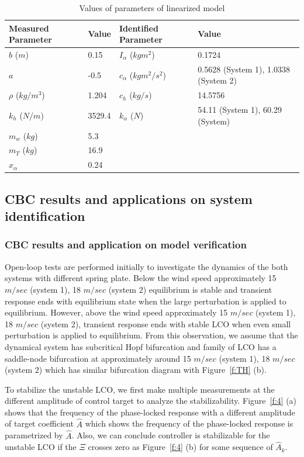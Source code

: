 \documentclass[openacc]{rsproca_new}%
\newcommand{\Fref}[1]{Figure~\ref{#1}}
\begin{document}
\begin{table}[!ht]
\caption{Values of parameters of linearized model}%
\label{t2}
\begin{tabular}{llll}%
\hline
Measured Parameter & Value & Identified Parameter & Value\\
\hline
$b$ ($m$) & 0.15   & $I_{\alpha}$ ($kgm^2$) & 0.1724   \\
$a$ & -0.5 & $c_\alpha$ ($kgm^2/s^2$) & 0.5628 (System 1), 1.0338 (System 2)   \\
$\rho$ ($kg/m^3$) & 1.204  & $c_h$ ($kg/s$)  & 14.5756   \\
$k_{h}$ ($N/m$) & 3529.4   & $k_\alpha$ ($N$) & 54.11 (System 1), 60.29 (System)   \\
$m_w$ ($kg$) & 5.3   & & \\
$m_T$ ($kg$) &  16.9   & &  \\
$x_\alpha$ & 0.24 & & \\
\hline
\end{tabular}
\vspace*{-4pt}
\end{table}%

\subsection{CBC results and applications on system identification}\label{results}
\subsubsection{CBC results and application on model verification}\label{lin_sys}
Open-loop tests are performed initially to investigate the dynamics of the both systems with different spring plate. Below the wind speed approximately 15 $m/sec$ (system 1), 18 $m/sec$ (system 2) equilibrium is stable and transient response ends with equilibrium state when the large perturbation is applied to equilibrium. However, above the wind speed approximately 15 $m/sec$ (system 1), 18 $m/sec$ (system 2), transient response ends with stable LCO when even small perturbation is applied to equilibrium. From this observation, we assume that the dynamical system has subcritical Hopf bifurcation and family of LCO has a saddle-node bifurcation at approximately around 15 $m/sec$ (system 1), 18 $m/sec$ (system 2) which has similar bifurcation diagram with \Fref{f:TH} (b).

To stabilize the unstable LCO, we first make multiple measurements at the different amplitude of control target to analyze the stabilizability. \Fref{f:4} (a) shows that the frequency of the phase-locked response with a different amplitude of target coefficient $\hat A$ which shows the frequency of the phase-locked response is parametrized by $\hat A$. Also, we can conclude controller is stabilizable for the unstable LCO if the $\Xi$ crosses zero as \Fref{f:4} (b) for some sequence of $\hat A_k$.
\end{document}

